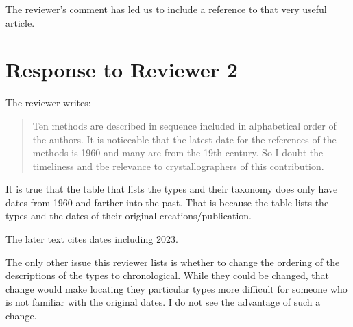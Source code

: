 \documentclass[preprint]{iucr}              %
\numberwithin{equation}{section}
\begin{document}
The reviewer's comment has led us to include a
reference to that very useful article.


	\section{Response to Reviewer 2}
	
	The reviewer writes:
	
\begin{quotation}
		Ten methods are described in sequence included in alphabetical order of the authors. It is noticeable that the latest
	date for the references of the methods is 1960 and many are from the 19th century. So I doubt the timeliness and
	tbe relevance to crystallographers of this contribution.
\end{quotation}

It is true that the table that lists the types and their taxonomy does
only have dates from 1960 and farther into the past. That is because
the table lists the types and the dates of their original 
creations/publication.

The later text cites dates including 2023. 

The only other issue this reviewer lists is whether to change
the ordering of the descriptions of the types to chronological.
While they could be changed, that change would make locating
they particular types more difficult for someone who is not familiar with the original dates. I do not see the
advantage of such a change.




			
			
			
			
			
			
			
			
			
			
			
			
		
\end{document}
